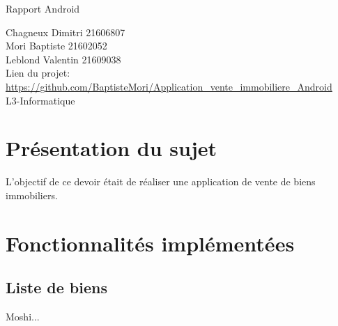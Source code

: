 \documentclass[a4paper,12pt]{article} %
\begin{document}


\begin{titlepage}

\vspace{7cm}

\begin{center}

\begin{Huge}
Rapport Android\\
\end{Huge}
\vspace{2cm}
\begin{large}
Chagneux Dimitri 21606807\\
Mori Baptiste 21602052\\
Leblond Valentin 21609038\\
\vspace{1cm}
Lien du projet:\\
\url{https://github.com/BaptisteMori/Application_vente_immobiliere_Android}\\
\vspace{1cm}
L3-Informatique
\end{large}

\end{center}
\end{titlepage}



\newpage

\tableofcontents

\newpage



\section{Présentation du sujet}

L'objectif de ce devoir était de réaliser une application de vente de biens immobiliers.

\section{Fonctionnalités implémentées}

\subsection{Liste de biens}
Moshi...
\end{document}
